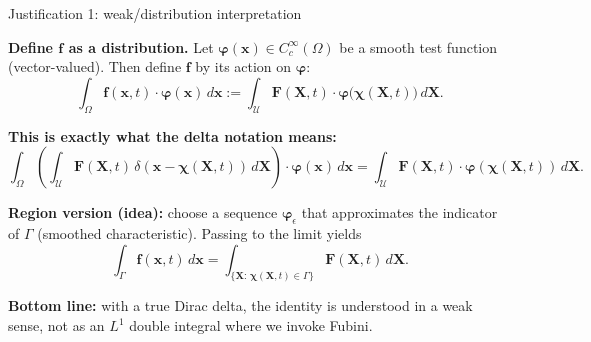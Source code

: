 \documentclass{beamer}
\begin{document}
\begin{frame}{Justification 1: weak/distribution interpretation}
\footnotesize

\textbf{Define $\mathbf{f}$ as a distribution.}
Let $\boldsymbol{\varphi}(\mathbf{x})\in C_c^\infty(\Omega)$ be a smooth test function (vector-valued).
Then define $\mathbf{f}$ by its action on $\boldsymbol{\varphi}$:
\[
\int_{\Omega}\mathbf{f}(\mathbf{x},t)\cdot \boldsymbol{\varphi}(\mathbf{x})\,d\mathbf{x}
:=
\int_{\mathcal U}\mathbf{F}(\mathbf{X},t)\cdot
\boldsymbol{\varphi}\!\big(\boldsymbol{\chi}(\mathbf{X},t)\big)\,d\mathbf{X}.
\]

\medskip
\textbf{This is exactly what the delta notation means:}
\[
\int_{\Omega}\left(\int_{\mathcal U}\mathbf{F}(\mathbf{X},t)\,
\delta(\mathbf{x}-\boldsymbol{\chi}(\mathbf{X},t))\,d\mathbf{X}\right)\cdot
\boldsymbol{\varphi}(\mathbf{x})\,d\mathbf{x}
=
\int_{\mathcal U}\mathbf{F}(\mathbf{X},t)\cdot \boldsymbol{\varphi}(\boldsymbol{\chi}(\mathbf{X},t))\,d\mathbf{X}.
\]

\medskip
\textbf{Region version (idea):} choose a sequence $\boldsymbol{\varphi}_\epsilon$ that approximates
the indicator of $\Gamma$ (smoothed characteristic). Passing to the limit yields
\[
\int_{\Gamma}\mathbf{f}(\mathbf{x},t)\,d\mathbf{x}
=
\int_{\{\mathbf{X}:\,\boldsymbol{\chi}(\mathbf{X},t)\in \Gamma\}}\mathbf{F}(\mathbf{X},t)\,d\mathbf{X}.
\]

\medskip
\textbf{Bottom line:} with a true Dirac delta, the identity is understood in a weak sense,
not as an $L^1$ double integral where we invoke Fubini.

\end{frame}



\end{document}
